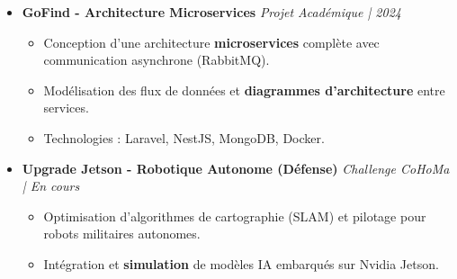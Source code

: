 \documentclass[a4paper,11pt]{article}
\begin{document}
\begin{itemize}[leftmargin=*, label={-}]
\item \textbf{GoFind - Architecture Microservices} \hfill \textit{Projet Académique | 2024}
\vspace{-2pt}
\begin{itemize}[leftmargin=0.4cm, nosep, label=\tiny$\bullet$]
    \item \small{Conception d'une architecture \textbf{microservices} complète avec communication asynchrone (RabbitMQ).}
    \item \small{Modélisation des flux de données et \textbf{diagrammes d'architecture} entre services.}
    \item \small{Technologies : Laravel, NestJS, MongoDB, Docker.}
\end{itemize}
\vspace{3pt}

\item \textbf{Upgrade Jetson - Robotique Autonome (Défense)} \hfill \textit{Challenge CoHoMa | En cours}
\vspace{-2pt}
\begin{itemize}[leftmargin=0.4cm, nosep, label=\tiny$\bullet$]
    \item \small{Optimisation d'algorithmes de cartographie (SLAM) et pilotage pour robots militaires autonomes.}
    \item \small{Intégration et \textbf{simulation} de modèles IA embarqués sur Nvidia Jetson.}
\end{itemize}

\end{itemize}

\end{document}
